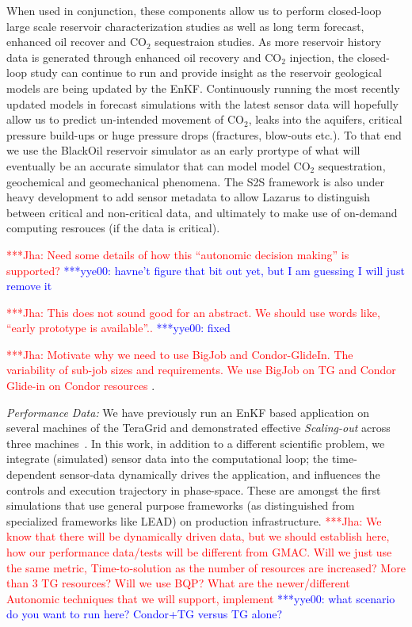 \documentclass[conference,final]{IEEEtran}
\newcommand{\jhanote}[1]{ {\textcolor{red} { ***Jha: #1 }}}
\newcommand{\yyenote}[1]{ {\textcolor{blue} { ***yye00: #1 }}}
\newcommand{\jhanote}[1]{}
\newcommand{\yyenote}[1]{}
\begin{document}
When used in conjunction, these components allow us to perform closed-loop large scale reservoir characterization studies as well 
as long term forecast, enhanced oil recover and CO$_2$ sequestraion studies. As more reservoir history data is generated through 
enhanced oil recovery and CO$_2$ injection, the closed-loop study can continue to run and provide insight as the reservoir
geological models are being updated by the EnKF. Continuously running the most recently updated models in forecast simulations 
with the latest sensor data will hopefully allow us to predict un-intended movement of CO$_2$, leaks into the aquifers, critical 
pressure build-ups or huge pressure drops (fractures, blow-outs etc.). To that end we use the BlackOil reservoir simulator as an 
early prortype of what will eventually be an accurate simulator that can model model CO$_2$ sequestration, geochemical and 
geomechanical phenomena. The S2S framework is also under heavy development to add sensor metadata to allow Lazarus to distinguish 
between critical and non-critical data, and ultimately to make use of on-demand computing resrouces (if the data is critical). 

\jhanote{Need some details of how this ``autonomic decision making'' is supported?}
\yyenote{havne't figure that bit out yet, but I am guessing I will just remove it}

\jhanote{This does not sound good for an abstract. We should use words like, ``early prototype is available''..}
\yyenote{fixed}

\jhanote{Motivate why we need to use BigJob and Condor-GlideIn. The variability of
sub-job sizes and requirements. We use BigJob on TG and Condor Glide-in on Condor
resources}.

{\it Performance Data: }We have previously run an EnKF based application on several machines of the TeraGrid and demonstrated 
effective {\it Scaling-out} across three machines~\cite{gmac}. In this work, in addition to a different scientific problem, we 
integrate (simulated) sensor data into the computational loop; the time-dependent sensor-data dynamically drives the application, 
and influences the controls and execution trajectory in phase-space. These are amongst the first simulations that use general 
purpose frameworks (as distinguished from specialized frameworks like LEAD) on production infrastructure. \jhanote{We know that 
there will be dynamically driven data, but we should establish here, how our performance data/tests will be different from GMAC.  
Will we just use the same metric, Time-to-solution as the number of resources are increased? More than 3 TG resources? Will we use 
BQP? What are the newer/different Autonomic techniques that we will support, implement} \yyenote{what scenario do you want to run
here? Condor+TG versus TG alone?}
\end{document}
